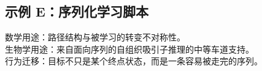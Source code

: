 \subsection*{示例 E：序列化学习脚本}

数学用途：路径结构与被学习的转变不对称性。\\
生物学用途：来自面向序列的自组织吸引子推理的中等车道支持。\\
行为迁移：目标不只是某个终点状态，而是一条容易被走完的序列。